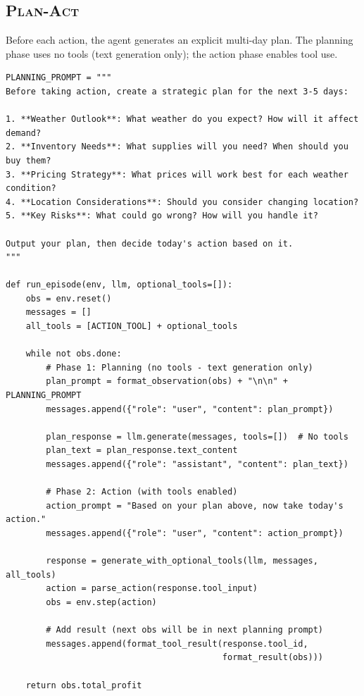 \subsection{\textsc{Plan-Act}}

Before each action, the agent generates an explicit multi-day plan. The planning phase uses no tools (text generation only); the action phase enables tool use.

\begin{verbatim}
PLANNING_PROMPT = """
Before taking action, create a strategic plan for the next 3-5 days:

1. **Weather Outlook**: What weather do you expect? How will it affect demand?
2. **Inventory Needs**: What supplies will you need? When should you buy them?
3. **Pricing Strategy**: What prices will work best for each weather condition?
4. **Location Considerations**: Should you consider changing location?
5. **Key Risks**: What could go wrong? How will you handle it?

Output your plan, then decide today's action based on it.
"""

def run_episode(env, llm, optional_tools=[]):
    obs = env.reset()
    messages = []
    all_tools = [ACTION_TOOL] + optional_tools
    
    while not obs.done:
        # Phase 1: Planning (no tools - text generation only)
        plan_prompt = format_observation(obs) + "\n\n" + PLANNING_PROMPT
        messages.append({"role": "user", "content": plan_prompt})
        
        plan_response = llm.generate(messages, tools=[])  # No tools
        plan_text = plan_response.text_content
        messages.append({"role": "assistant", "content": plan_text})
        
        # Phase 2: Action (with tools enabled)
        action_prompt = "Based on your plan above, now take today's action."
        messages.append({"role": "user", "content": action_prompt})
        
        response = generate_with_optional_tools(llm, messages, all_tools)
        action = parse_action(response.tool_input)
        obs = env.step(action)
        
        # Add result (next obs will be in next planning prompt)
        messages.append(format_tool_result(response.tool_id, 
                                           format_result(obs)))
    
    return obs.total_profit
\end{verbatim}

